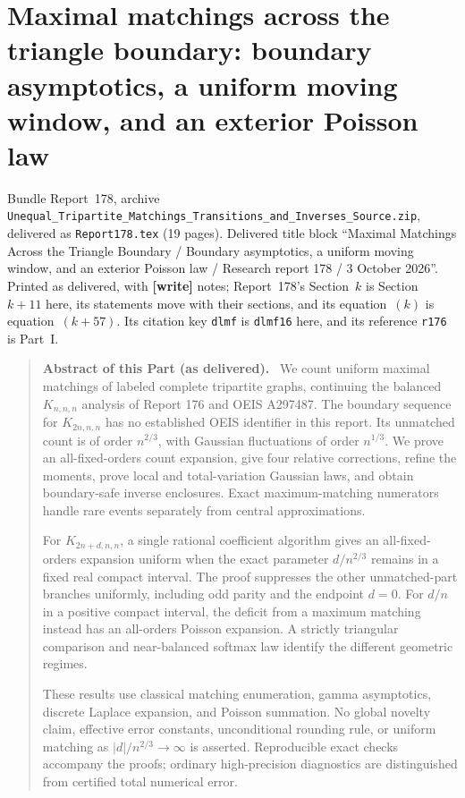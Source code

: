 \documentclass[11pt,letterpaper]{article}
\newcommand{\parthead}{Contents}
\theoremstyle{remark}\newtheorem{remark}[theorem]{Remark}
\newcommand{\file}[1]{\nolinkurl{#1}}
\newenvironment{partabstract}{\begin{quote}\small\noindent\textbf{Abstract of this Part (as delivered).}\ }{\end{quote}}
\newcommand{\partsource}[1]{\par\noindent\begin{minipage}{\textwidth}\small #1\end{minipage}\par\medskip}
\begin{document}
\clearpage
\renewcommand{\parthead}{Part II (Report 178)}
\part{Maximal matchings across the triangle boundary: boundary asymptotics, a uniform moving window, and an exterior Poisson law}\label{tmm:bd:part}
\partsource{Bundle Report~178, archive \file{Unequal_Tripartite_Matchings_Transitions_and_Inverses_Source.zip}, delivered as \file{Report178.tex} (19 pages). Delivered title block ``Maximal Matchings Across the Triangle Boundary / Boundary asymptotics, a uniform moving window, and an exterior Poisson law / Research report 178 / 3 October 2026''. Printed as delivered, with \textbf{[write]} notes; Report~178's Section~$k$ is Section~$k+11$ here, its statements move with their sections, and its equation~$(k)$ is equation~$(k+57)$. Its citation key \texttt{dlmf} is \texttt{dlmf16} here, and its reference \texttt{r176} is Part~I.}
\begin{partabstract}
We count uniform maximal matchings of labeled complete tripartite graphs, continuing the balanced $K_{n,n,n}$ analysis of Report 176 and OEIS A297487. The boundary sequence for $K_{2n,n,n}$ has no established OEIS identifier in this report. Its unmatched count is of order $n^{2/3}$, with Gaussian fluctuations of order $n^{1/3}$. We prove an all-fixed-orders count expansion, give four relative corrections, refine the moments, prove local and total-variation Gaussian laws, and obtain boundary-safe inverse enclosures. Exact maximum-matching numerators handle rare events separately from central approximations.

For $K_{2n+d,n,n}$, a single rational coefficient algorithm gives an all-fixed-orders expansion uniform when the exact parameter $d/n^{2/3}$ remains in a fixed real compact interval. The proof suppresses the other unmatched-part branches uniformly, including odd parity and the endpoint $d=0$. For $d/n$ in a positive compact interval, the deficit from a maximum matching instead has an all-orders Poisson expansion. A strictly triangular comparison and near-balanced softmax law identify the different geometric regimes.

These results use classical matching enumeration, gamma asymptotics, discrete Laplace expansion, and Poisson summation. No global novelty claim, effective error constants, unconditional rounding rule, or uniform matching as $|d|/n^{2/3}\to\infty$ is asserted. Reproducible exact checks accompany the proofs; ordinary high-precision diagnostics are distinguished from certified total numerical error.
\end{partabstract}
\end{document}
